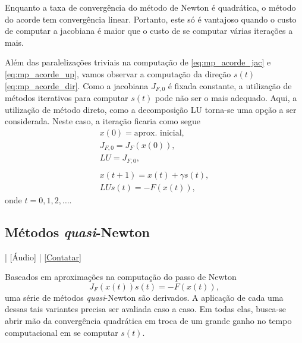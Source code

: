 Enquanto a taxa de convergência do método de Newton é quadrática, o método do acorde tem convergência linear. Portanto, este só é vantajoso quando o custo de computar a jacobiana é maior que o custo de se computar várias iterações a mais.

Além das paralelizações triviais na computação de \eqref{eq:mp_acorde_jac} e \eqref{eq:mp_acorde_up}, vamos observar a computação da direção $s(t)$ \eqref{eq:mp_acorde_dir}. Como a jacobiana $J_{F,0}$ é fixada constante, a utilização de métodos iterativos para computar $s(t)$ pode não ser o mais adequado. Aqui, a utilização de método direto, como a decomposição LU torna-se uma opção a ser considerada. Neste caso, a iteração ficaria como segue
\begin{gather}
  x(0) = \text{aprox. inicial},\\
  J_{F,0} = J_F\left(x(0)\right),\\
  LU = J_{F,0},\\
  ~\nonumber\\
  x(t+1) = x(t) + \gamma s(t),\label{eq:mp_acorde_up}\\
  LUs(t) = -F(x(t)),\label{eq:mp_acorde_dir}
\end{gather}
onde $t=0, 1, 2, \ldots$.

\subsection{Métodos {\it quasi}-Newton}

\begin{flushright}
  [Vídeo] | [Áudio] | \href{https://phkonzen.github.io/notas/contato.html}{[Contatar]}
\end{flushright}

Baseados em aproximações na computação do passo de Newton
\begin{equation}
  J_F\left(x(t)\right)s(t) = -F\left(x(t)\right),
\end{equation}
uma série de métodos {\it quasi}-Newton são derivados. A aplicação de cada uma dessas tais variantes precisa ser avaliada caso a caso. Em todas elas, busca-se abrir mão da convergência quadrática em troca de um grande ganho no tempo computacional em se computar $s(t)$.

